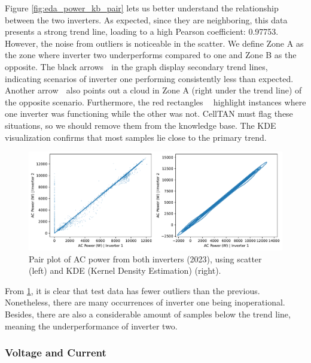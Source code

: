 Figure \ref{fig:eda_power_kb_pair} lets us better understand the relationship between the two inverters. As expected, since they are neighboring, this data presents a strong trend line, loading to a high Pearson coefficient: 0.97753. However, the noise from outliers is noticeable in the scatter. We define Zone A as the zone where inverter two underperforms compared to one and Zone B as the opposite. The black arrows \textcircled{} in the graph display secondary trend lines, indicating scenarios of inverter one performing consistently less than expected. Another arrow \textcircled{} also points out a cloud in Zone A (right under the trend line) of the opposite scenario. Furthermore, the red rectangles \textcircled{}\textcircled{} highlight instances where one inverter was functioning while the other was not. CellTAN must flag these situations, so we should remove them from the knowledge base. The KDE visualization confirms that most samples lie close to the primary trend.

\begin{figure}[h!]
    \centering
    \includegraphics[width=\textwidth]{figures/chapter5/analysis/03_power_pairplots_test.pdf}
    \caption{Pair plot of AC power from both inverters (2023), using scatter (left) and KDE (Kernel Density Estimation) (right).}
    \label{fig:eda_power_test_pair}
\end{figure}

From \ref{fig:eda_power_test_pair}, it is clear that test data has fewer outliers than the previous. Nonetheless, there are many occurrences of inverter one being inoperational. Besides, there are also a considerable amount of samples below the trend line, meaning the underperformance of inverter two.


\subsubsection{Voltage and Current} \label{subsubsec:eda_volt_curr}

